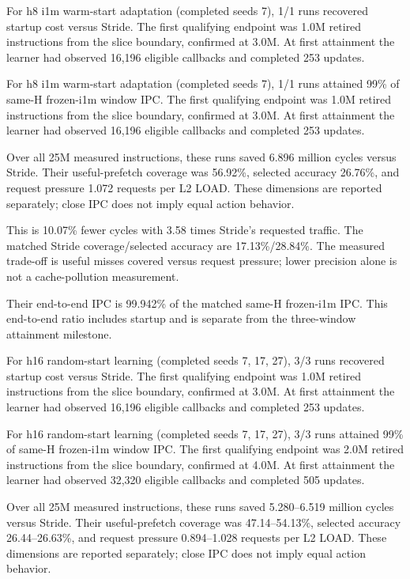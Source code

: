 \documentclass[10pt]{article}
\begin{document}
For h8 i1m warm-start adaptation (completed seeds 7), 1/1 runs recovered startup cost versus Stride. The first qualifying endpoint was 1.0M retired instructions from the slice boundary, confirmed at 3.0M. At first attainment the learner had observed 16,196 eligible callbacks and completed 253 updates.

For h8 i1m warm-start adaptation (completed seeds 7), 1/1 runs attained 99\% of same-H frozen-i1m window IPC. The first qualifying endpoint was 1.0M retired instructions from the slice boundary, confirmed at 3.0M. At first attainment the learner had observed 16,196 eligible callbacks and completed 253 updates.

Over all 25M measured instructions, these runs saved 6.896 million cycles versus Stride. Their useful-prefetch coverage was 56.92\%, selected accuracy 26.76\%, and request pressure 1.072 requests per L2 LOAD. These dimensions are reported separately; close IPC does not imply equal action behavior.

This is 10.07\% fewer cycles with 3.58 times Stride's requested traffic. The matched Stride coverage/selected accuracy are 17.13\%/28.84\%. The measured trade-off is useful misses covered versus request pressure; lower precision alone is not a cache-pollution measurement.

Their end-to-end IPC is 99.942\% of the matched same-H frozen-i1m IPC. This end-to-end ratio includes startup and is separate from the three-window attainment milestone.

For h16 random-start learning (completed seeds 7, 17, 27), 3/3 runs recovered startup cost versus Stride. The first qualifying endpoint was 1.0M retired instructions from the slice boundary, confirmed at 3.0M. At first attainment the learner had observed 16,196 eligible callbacks and completed 253 updates.

For h16 random-start learning (completed seeds 7, 17, 27), 3/3 runs attained 99\% of same-H frozen-i1m window IPC. The first qualifying endpoint was 2.0M retired instructions from the slice boundary, confirmed at 4.0M. At first attainment the learner had observed 32,320 eligible callbacks and completed 505 updates.

Over all 25M measured instructions, these runs saved 5.280--6.519 million cycles versus Stride. Their useful-prefetch coverage was 47.14--54.13\%, selected accuracy 26.44--26.63\%, and request pressure 0.894--1.028 requests per L2 LOAD. These dimensions are reported separately; close IPC does not imply equal action behavior.
\end{document}
